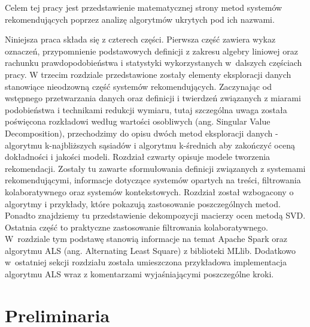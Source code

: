 \documentclass[12pt,a4paper]{report}
\begin{document}
Celem tej pracy jest przedstawienie matematycznej strony metod systemów rekomendujących poprzez analizę algorytmów ukrytych pod ich nazwami.

Niniejsza praca składa się z czterech części. Pierwsza część zawiera wykaz oznaczeń, przypomnienie podstawowych definicji z zakresu algebry liniowej oraz rachunku prawdopodobieństwa i statystyki wykorzystanych w~dalszych częściach pracy. W trzecim rozdziale przedstawione zostały elementy eksploracji danych stanowiące nieodzowną część systemów rekomendujących. Zaczynając od wstępnego przetwarzania danych oraz definicji i twierdzeń związanych z miarami podobieństwa i technikami redukcji wymiaru, tutaj szczególna uwaga została poświęcona rozkładowi według wartości osobliwych (ang. Singular Value Decomposition), przechodzimy do opisu dwóch metod eksploracji danych - algorytmu k-najbliższych sąsiadów i algorytmu k-średnich aby zakończyć oceną dokładności i jakości modeli. Rozdział czwarty opisuje modele tworzenia rekomendacji. Zostały tu zawarte sformułowania definicji związanych z systemami rekomendującymi, informacje dotyczące systemów opartych na treści, filtrowania kolaboratywnego oraz systemów kontekstowych. Rozdział został wzbogacony o algorytmy i przykłady, które pokazują zastosowanie poszczególnych metod. Ponadto znajdziemy tu przedstawienie dekompozycji macierzy ocen metodą SVD. Ostatnia część to praktyczne zastosowanie filtrowania kolaboratywnego. W~rozdziale tym podstawę stanowią informacje na temat Apache Spark oraz algorytmu ALS (ang. Alternating Least Square) z biblioteki MLlib. Dodatkowo w~ostatniej sekcji rozdziału została umieszczona przykładowa implementacja algorytmu ALS wraz z komentarzami wyjaśniającymi poszczególne kroki. 



\chapter{Preliminaria} %
\end{document}
